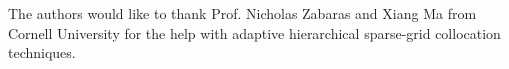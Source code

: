 The authors would like to thank Prof. Nicholas Zabaras and Xiang Ma from
Cornell University for the help with adaptive hierarchical sparse-grid
collocation techniques.
